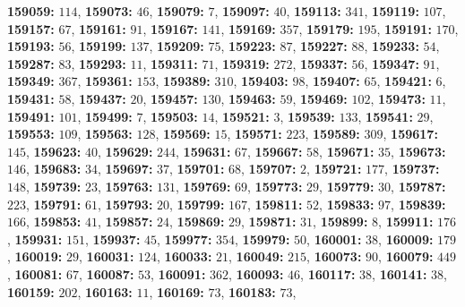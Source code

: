 \textsf{\bfseries 159059:} $114$, \textsf{\bfseries 159073:} $46$, \textsf{\bfseries 159079:} $7$, \textsf{\bfseries 159097:} $40$, \textsf{\bfseries 159113:} $341$, \textsf{\bfseries 159119:} $107$, \textsf{\bfseries 159157:} $67$, \textsf{\bfseries 159161:} $91$, \textsf{\bfseries 159167:} $141$, \textsf{\bfseries 159169:} $357$, \textsf{\bfseries 159179:} $195$, \textsf{\bfseries 159191:} $170$, \textsf{\bfseries 159193:} $56$, \textsf{\bfseries 159199:} $137$, \textsf{\bfseries 159209:} $75$, \textsf{\bfseries 159223:} $87$, \textsf{\bfseries 159227:} $88$, \textsf{\bfseries 159233:} $54$, \textsf{\bfseries 159287:} $83$, \textsf{\bfseries 159293:} $11$, \textsf{\bfseries 159311:} $71$, \textsf{\bfseries 159319:} $272$, \textsf{\bfseries 159337:} $56$, \textsf{\bfseries 159347:} $91$, \textsf{\bfseries 159349:} $367$, \textsf{\bfseries 159361:} $153$, \textsf{\bfseries 159389:} $310$, \textsf{\bfseries 159403:} $98$, \textsf{\bfseries 159407:} $65$, \textsf{\bfseries 159421:} $6$, \textsf{\bfseries 159431:} $58$, \textsf{\bfseries 159437:} $20$, \textsf{\bfseries 159457:} $130$, \textsf{\bfseries 159463:} $59$, \textsf{\bfseries 159469:} $102$, \textsf{\bfseries 159473:} $11$, \textsf{\bfseries 159491:} $101$, \textsf{\bfseries 159499:} $7$, \textsf{\bfseries 159503:} $14$, \textsf{\bfseries 159521:} $3$, \textsf{\bfseries 159539:} $133$, \textsf{\bfseries 159541:} $29$, \textsf{\bfseries 159553:} $109$, \textsf{\bfseries 159563:} $128$, \textsf{\bfseries 159569:} $15$, \textsf{\bfseries 159571:} $223$, \textsf{\bfseries 159589:} $309$, \textsf{\bfseries 159617:} $145$, \textsf{\bfseries 159623:} $40$, \textsf{\bfseries 159629:} $244$, \textsf{\bfseries 159631:} $67$, \textsf{\bfseries 159667:} $58$, \textsf{\bfseries 159671:} $35$, \textsf{\bfseries 159673:} $146$, \textsf{\bfseries 159683:} $34$, \textsf{\bfseries 159697:} $37$, \textsf{\bfseries 159701:} $68$, \textsf{\bfseries 159707:} $2$, \textsf{\bfseries 159721:} $177$, \textsf{\bfseries 159737:} $148$, \textsf{\bfseries 159739:} $23$, \textsf{\bfseries 159763:} $131$, \textsf{\bfseries 159769:} $69$, \textsf{\bfseries 159773:} $29$, \textsf{\bfseries 159779:} $30$, \textsf{\bfseries 159787:} $223$, \textsf{\bfseries 159791:} $61$, \textsf{\bfseries 159793:} $20$, \textsf{\bfseries 159799:} $167$, \textsf{\bfseries 159811:} $52$, \textsf{\bfseries 159833:} $97$, \textsf{\bfseries 159839:} $166$, \textsf{\bfseries 159853:} $41$, \textsf{\bfseries 159857:} $24$, \textsf{\bfseries 159869:} $29$, \textsf{\bfseries 159871:} $31$, \textsf{\bfseries 159899:} $8$, \textsf{\bfseries 159911:} $176$, \textsf{\bfseries 159931:} $151$, \textsf{\bfseries 159937:} $45$, \textsf{\bfseries 159977:} $354$, \textsf{\bfseries 159979:} $50$, \textsf{\bfseries 160001:} $38$, \textsf{\bfseries 160009:} $179$, \textsf{\bfseries 160019:} $29$, \textsf{\bfseries 160031:} $124$, \textsf{\bfseries 160033:} $21$, \textsf{\bfseries 160049:} $215$, \textsf{\bfseries 160073:} $90$, \textsf{\bfseries 160079:} $449$, \textsf{\bfseries 160081:} $67$, \textsf{\bfseries 160087:} $53$, \textsf{\bfseries 160091:} $362$, \textsf{\bfseries 160093:} $46$, \textsf{\bfseries 160117:} $38$, \textsf{\bfseries 160141:} $38$, \textsf{\bfseries 160159:} $202$, \textsf{\bfseries 160163:} $11$, \textsf{\bfseries 160169:} $73$, \textsf{\bfseries 160183:} $73$, 

